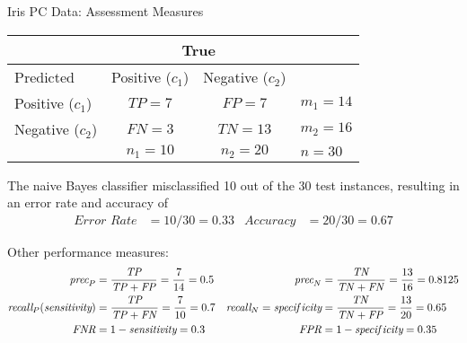 \begin{frame}{Iris PC Data: Assessment Measures}
\renewcommand{\arraystretch}{1.1}
\begin{small}
\begin{center}
\begin{tabular}{|l||c|c||l|}
    \hline
    & \multicolumn{2}{c||}{True} & \\
    \hline
     Predicted & Positive ($c_1$) & Negative ($c_2$) & \\
    \hline\hline
  Positive ($c_1$)&   $\mathit{TP}=7$  & $\mathit{FP}=7$ & $m_1 = 14$\\
  Negative  ($c_2$)&   $\mathit{FN}=3$ & $\mathit{TN}=13$ & $m_2 = 16$\\
  \hline
  & $n_1 = 10$ & $n_2 = 20$ & $n=30$\\
  \hline
  \end{tabular}%
\end{center}
\small
The
  naive Bayes classif\/{i}er misclassif\/{i}ed 10 out of the 30 test instances,
  resulting in an error rate and accuracy of
  \begin{align*}
    \textit{Error\ Rate} &= {10/30} = 0.33 & 
    \textit{Accuracy} & = {20/30} = 0.67
  \end{align*}
  
  Other performance measures:
  \begin{align*}
    \textit{prec}_P & = {\mathit{TP} \over \mathit{TP}+\mathit{FP}} = {7
	\over 14} = 0.5 & 
    \textit{prec}_N & = {\mathit{TN} \over \mathit{TN}+\mathit{FN}} = {13 \over 16} = 0.8125\\
	  \textit{recall}_P (\textit{sensitivity})
    & = {\mathit{TP} \over \mathit{TP}+\mathit{FN}} = {7 \over 10} = 0.7 &
	  \textit{recall}_N = \textit{specif\/{i}city}
    & = {\mathit{TN} \over \mathit{TN}+\mathit{FP}} = {13 \over 20} = 0.65\\
    \mathit{FNR} & = 1 - \textit{sensitivity} = 0.3 & 
    \mathit{FPR} & = 1 - \textit{specif\/{i}city} = 0.35
  \end{align*}
\end{small}
\end{frame}

\ifdefined\wox \begin{frame} \titlepage \end{frame} \fi

